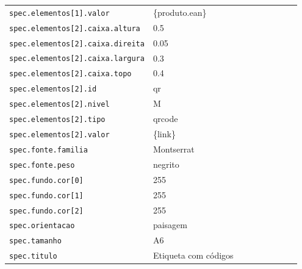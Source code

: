 \begin{tabular}{@{}p{0.35\linewidth}p{0.6\linewidth}@{}}
\texttt{spec.elementos[1].valor} & \{produto.ean\} \\
\texttt{spec.elementos[2].caixa.altura} & 0.5 \\
\texttt{spec.elementos[2].caixa.direita} & 0.05 \\
\texttt{spec.elementos[2].caixa.largura} & 0.3 \\
\texttt{spec.elementos[2].caixa.topo} & 0.4 \\
\texttt{spec.elementos[2].id} & qr \\
\texttt{spec.elementos[2].nivel} & M \\
\texttt{spec.elementos[2].tipo} & qrcode \\
\texttt{spec.elementos[2].valor} & \{link\} \\
\texttt{spec.fonte.familia} & Montserrat \\
\texttt{spec.fonte.peso} & negrito \\
\texttt{spec.fundo.cor[0]} & 255 \\
\texttt{spec.fundo.cor[1]} & 255 \\
\texttt{spec.fundo.cor[2]} & 255 \\
\texttt{spec.orientacao} & paisagem \\
\texttt{spec.tamanho} & A6 \\
\texttt{spec.titulo} & Etiqueta com códigos \\
\end{tabular}
